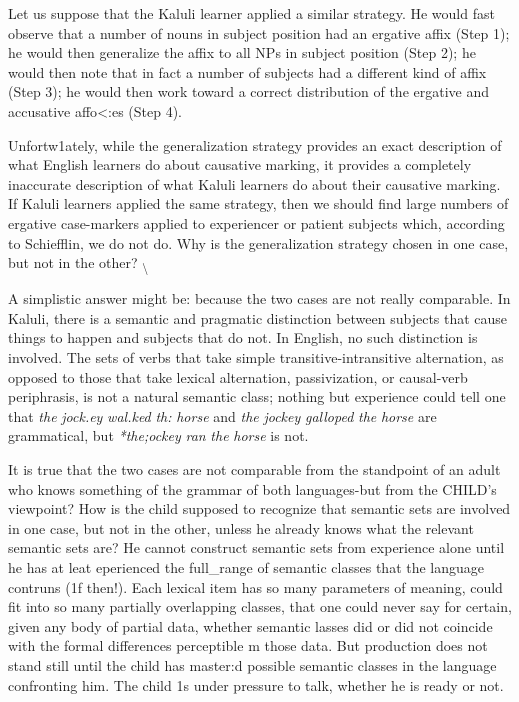 Let us suppose that the Kaluli learner applied a similar strategy. He would fast observe that a number of nouns in subject position had an ergative affix (Step 1); he would then generalize the affix to all NPs in subject position (Step 2); he would then note that in fact a number of subjects had a different kind of affix (Step 3); he would then work toward a correct distribution of the ergative and accusative affo{\textless}:es (Step 4).

Unfortw1ately, while the generalization strategy provides an exact description of what English learners do about causative marking, it provides a completely inaccurate description of what Kaluli learners do about their causative marking. If Kaluli learners applied the same strategy, then we should find large numbers of ergative case-markers applied to experiencer or patient subjects which, according to Schief\-flin, we do not do. Why is the generalization strategy chosen in one case, but not in the other? \textsubscript{{\textbackslash}}


A simplistic answer might be: because the two cases are not really comparable. In Kaluli, there is a semantic and pragmatic distinc\-tion between subjects that cause things to happen and subjects that do not. In English, no such distinction is involved. The sets of verbs that take simple transitive-intransitive alternation, as opposed to those that take lexical alternation, passivization, or causal-verb periphrasis, is not a natural semantic class; nothing but experience could tell one that \textit{the} \textit{jock.}\textit{ey} \textit{wal.ked} \textit{th}\textit{:} \textit{horse} and \textit{the} \textit{jockey} \textit{galloped} \textit{the} \textit{horse} are gram\-matical, but \textit{*the;ockey} \textit{ran} \textit{the} \textit{horse} is not.

It is true that the two cases are not comparable from the stand\-point of an adult who knows something of the grammar of both lan\-guages-but from the CHILD's viewpoint? How is the child supposed to recognize that semantic sets are involved in one case, but not in the other, unless he already knows what the relevant semantic sets are? He cannot construct semantic sets from experience alone until he has at leat eperienced the full\_range of semantic classes that the language contruns (1f then!). Each lexical item has so many parameters of mean\-ing, could fit into so many partially overlapping classes, that one could never say for certain, given any body of partial data, whether semantic lasses did or did not coincide with the formal differences perceptible m those data. But production does not stand still until the child has master:d possible semantic classes in the language confronting him. The child 1s under pressure to talk, whether he is ready or not.

